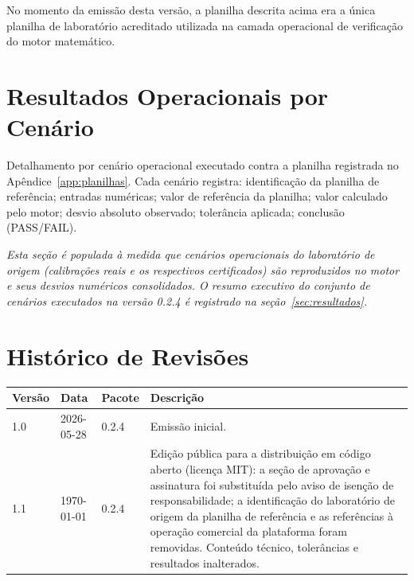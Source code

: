 \documentclass[11pt,a4paper]{article}
\newcommand{\docVersion}{0.2.4}
\newcommand{\docRevision}{1.1}
\newcommand{\docDate}{\today}
\begin{document}
\vspace{0.3cm}
No momento da emissão desta versão, a planilha descrita acima era a única planilha de laboratório acreditado utilizada na camada operacional de verificação do motor matemático.

\section{Resultados Operacionais por Cenário}
\label{app:planilhas-resultados}

Detalhamento por cenário operacional executado contra a planilha registrada no Apêndice~\ref{app:planilhas}. Cada cenário registra: identificação da planilha de referência; entradas numéricas; valor de referência da planilha; valor calculado pelo motor; desvio absoluto observado; tolerância aplicada; conclusão (\textsf{PASS}/\textsf{FAIL}).

\vspace{0.3cm}
\textit{Esta seção é populada à medida que cenários operacionais do laboratório de origem (calibrações reais e os respectivos certificados) são reproduzidos no motor e seus desvios numéricos consolidados. O resumo executivo do conjunto de cenários executados na versão \docVersion{} é registrado na seção~\ref{sec:resultados}.}

\section{Histórico de Revisões}

\begin{tabularx}{\textwidth}{l l l X}
  \toprule
  \textbf{Versão} & \textbf{Data} & \textbf{Pacote} & \textbf{Descrição} \\
  \midrule
  1.0 & 2026-05-28 & \docVersion & Emissão inicial. \\
  \docRevision & \docDate & \docVersion & Edição pública para a distribuição em código aberto (licença MIT): a seção de aprovação e assinatura foi substituída pelo aviso de isenção de responsabilidade; a identificação do laboratório de origem da planilha de referência e as referências à operação comercial da plataforma foram removidas. Conteúdo técnico, tolerâncias e resultados inalterados. \\
  \bottomrule
\end{tabularx}
\end{document}
